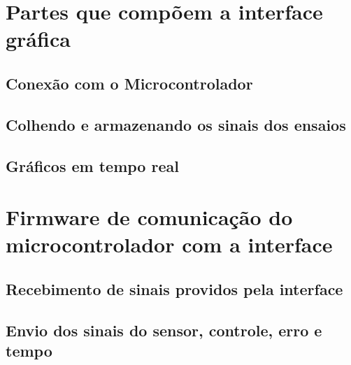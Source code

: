 \section{Partes que compõem a interface gráfica}

\subsection{Conexão com o Microcontrolador}

\subsection{Colhendo e armazenando os sinais dos ensaios}

\subsection{Gráficos em tempo real}


\section{Firmware de comunicação do microcontrolador com a interface}

\subsection{Recebimento de sinais providos pela interface}

\subsection{Envio dos sinais do sensor, controle, erro e tempo}